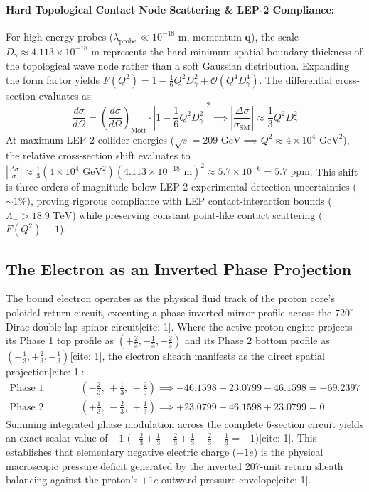 \documentclass[11pt,a4paper]{article}
\begin{document}
	\paragraph{Hard Topological Contact Node Scattering \& LEP-2 Compliance:}
	For high-energy probes ($\lambda_{\text{probe}} \ll 10^{-18}\text{ m}$, momentum $\mathbf{q}$), the scale $D_\gamma \approx 4.113 \times 10^{-18}\text{ m}$ represents the hard minimum spatial boundary thickness of the topological wave node rather than a soft Gaussian distribution. Expanding the form factor yields $F(Q^2) = 1 - \frac{1}{6} Q^2 D_\gamma^2 + \mathcal{O}(Q^4 D_\gamma^4)$. The differential cross-section evaluates as:
	\begin{equation}
		\frac{d\sigma}{d\Omega} = \left(\frac{d\sigma}{d\Omega}\right)_{\text{Mott}} \cdot \left| 1 - \frac{1}{6} Q^2 D_\gamma^2 \right|^2 \implies \left|\frac{\Delta\sigma}{\sigma_{\text{SM}}}\right| \approx \frac{1}{3} Q^2 D_\gamma^2
	\end{equation}
	At maximum LEP-2 collider energies ($\sqrt{s} = 209\text{ GeV} \implies Q^2 \approx 4 \times 10^4\text{ GeV}^2$), the relative cross-section shift evaluates to $\left|\frac{\Delta\sigma}{\sigma}\right| \approx \frac{1}{3} (4\times 10^4\text{ GeV}^2) (4.113\times 10^{-18}\text{ m})^2 \approx 5.7 \times 10^{-6} = 5.7\text{ ppm}$. This shift is three orders of magnitude below LEP-2 experimental detection uncertainties ($\sim 1\%$), proving rigorous compliance with LEP contact-interaction bounds ($\Lambda_- > 18.9\text{ TeV}$) while preserving constant point-like contact scattering ($F(Q^2) \equiv 1$).
	
	\subsection{The Electron as an Inverted Phase Projection}
	The bound electron operates as the physical fluid track of the proton core's poloidal return circuit, executing a phase-inverted mirror profile across the $720^\circ$ Dirac double-lap spinor circuit[cite: 1]. Where the active proton engine projects its Phase 1 top profile as $(+\frac{2}{3}, -\frac{1}{3}, +\frac{2}{3})$ and its Phase 2 bottom profile as $(-\frac{1}{3}, +\frac{2}{3}, -\frac{1}{3})$[cite: 1], the electron sheath manifests as the direct spatial projection[cite: 1]:
	\begin{align}
		\text{Phase 1 (Sections 1--3):} & \quad \left(-\frac{2}{3}, \, +\frac{1}{3}, \, -\frac{2}{3}\right) \implies -46.1598 + 23.0799 - 46.1598 = -69.2397 \\
		\text{Phase 2 (Sections 4--6):} & \quad \left(+\frac{1}{3}, \, -\frac{2}{3}, \, +\frac{1}{3}\right) \implies +23.0799 - 46.1598 + 23.0799 = 0
	\end{align}
	Summing integrated phase modulation across the complete 6-section circuit yields an exact scalar value of $-1$ ($-\frac{2}{3} + \frac{1}{3} - \frac{2}{3} + \frac{1}{3} - \frac{2}{3} + \frac{1}{3} = -1$)[cite: 1]. This establishes that elementary negative electric charge ($-1e$) is the physical macroscopic pressure deficit generated by the inverted 207-unit return sheath balancing against the proton's $+1e$ outward pressure envelope[cite: 1].
	
\end{document}
